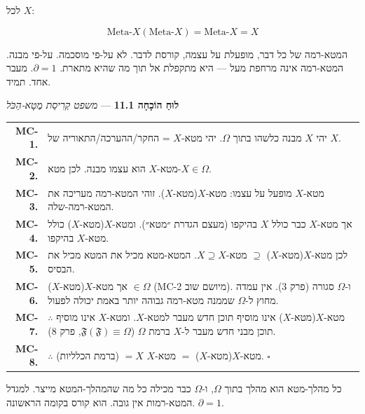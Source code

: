 \documentclass[10pt, openany, oneside]{book}
\renewcommand{\footnotesize}{\fontsize{8.5}{11}\selectfont}
\begin{document}
\vspace{2em}


\noindent לכל $X$:

$$\text{Meta-}X(\text{Meta-}X) = \text{Meta-}X = X$$

המטא-רמה של כל דבר, מופעלת על עצמה, קורסת לדבר. לא על-פי מוסכמה. על-פי מבנה. המטא-רמה אינה מרחפת מעל — היא מתקפלת אל תוך מה שהיא מתארת. $\partial = 1$. מעבר אחד. תמיד.

\vspace{0.5em}

\textbf{לוּחַ הוֹכָחָה 11.1} --- \textit{משפט קְרִיסַת מֶטָא-הַכֹּל}

\vspace{0.5em}

{\footnotesize
\noindent\begin{tabular}{r p{}}
\textbf{MC-1.} & יהי $X$ מבנה כלשהו בתוך $\Omega$. יהי מטא-$X$ = החקר/ההערכה/התאוריה של $X$. \\[0.3em]
\textbf{MC-2.} & מטא-$X$ הוא עצמו מבנה. לכן מטא-$X \in \Omega$. \\[0.3em]
\textbf{MC-3.} & מטא-$X$ מופעל על עצמו: מטא-$X$(מטא-$X$). זוהי המטא-רמה מעריכה את המטא-רמה-שלה. \\[0.3em]
\textbf{MC-4.} & אך מטא-$X$ כבר כולל $X$ בהיקפו (מעצם הגדרת ״מטא״). ומטא-$X$(מטא-$X$) כולל מטא-$X$ בהיקפו. \\[0.3em]
\textbf{MC-5.} & לכן מטא-$X$(מטא-$X$) $\supseteq$ מטא-$X \supseteq X$. המטא-מטא מכיל את המטא מכיל את הבסיס. \\[0.3em]
\textbf{MC-6.} & אך מטא-$X$(מטא-$X$) $\in \Omega$ (MC-2 מיושם שוב). ו-$\Omega$ סגורה (פרק 3). אין עמדה מחוץ ל-$\Omega$ שממנה מטא-רמה גבוהה יותר באמת יכולה לפעול. \\[0.3em]
\textbf{MC-7.} & $\therefore$ מטא-$X$(מטא-$X$) אינו מוסיף תוכן חדש מעבר למטא-$X$. ומטא-$X$ אינו מוסיף תוכן מבני חדש מעבר ל-$X$ ברמת $\Omega$ ($\mathfrak{F}(\mathfrak{F}) \equiv \Omega$, פרק 8). \\[0.3em]
\textbf{MC-8.} & $\therefore$ מטא-$X$(מטא-$X$) $=$ מטא-$X$ $= X$ (ברמת הכלליות). $\square$ \\[0.3em]
\end{tabular}
}

\vspace{0.8em}

\noindent כל מהלך-מטא הוא מהלך בתוך $\Omega$, ו-$\Omega$ כבר מכילה כל מה שהמהלך-המטא מייצר. למגדל המטא-רמות אין גובה. הוא קורס בקומה הראשונה. $\partial = 1$.
\end{document}

